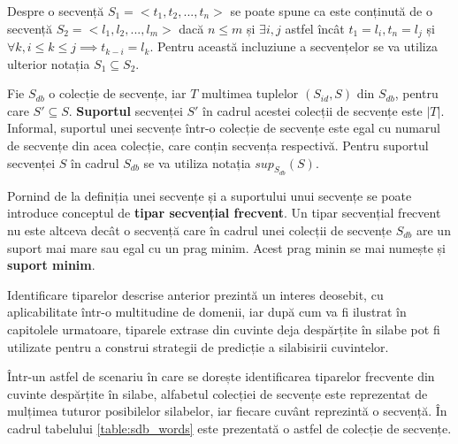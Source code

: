 Despre o secvență $S_1=<t_1, t_2, ...,t_n>$ se poate spune ca este conținută de o secvență $S_2=<l_1, l_2, ...,l_m>$ dacă $n \leq m$ și $ \exists i,j$ astfel încât $t_1 = l_i, t_n = l_j$ și $\forall k, i \leq k \leq j \implies t_{k-i} = l_k$. Pentru această incluziune a secvențelor se va utiliza ulterior notația $S_1 \subseteq S_2$.      
\begin{defi}

Fie $S_{db}$ o colecție de secvențe, iar $T$ multimea tuplelor $(S_{id}, S)$ din $S_{db}$, pentru care $S' \subseteq S$. \textbf{Suportul} secvenței $S'$ în cadrul acestei colecții de secvențe este $\vert T \vert$.  Informal, suportul unei secvențe într-o colecție de secvențe este egal cu numarul de secvențe din acea colecție, care conțin secvența respectivă. Pentru suportul secvenței $S$ în cadrul $S_{db}$ se va utiliza notația $sup_{S_{db}}(S)$.
\end{defi}

Pornind de la definiția unei secvențe și a suportului unui secvențe se poate introduce conceptul de \textbf{tipar secvențial frecvent}. Un tipar secvențial frecvent nu este altceva decât o secvență care în cadrul unei colecții de secvențe $S_{db}$ are un suport mai mare sau egal cu un prag minim. Acest prag minin se mai numește și \textbf{suport minim}.

Identificare tiparelor descrise anterior prezintă un interes deosebit, cu aplicabilitate într-o multitudine de domenii, iar după cum va fi ilustrat în capitolele urmatoare, tiparele extrase din cuvinte deja despărțite în silabe pot fi utilizate pentru a construi strategii de predicție a silabisirii cuvintelor. 

\begin{ex}
Într-un astfel de scenariu în care se dorește identificarea tiparelor frecvente din cuvinte despărțite în silabe, alfabetul colecției de secvențe este reprezentat de mulțimea tuturor posibilelor silabelor, iar fiecare cuvânt reprezintă o secvență. În cadrul tabelului \ref{table:sdb_words} este prezentată o astfel de colecție de secvențe.
\end{ex}


